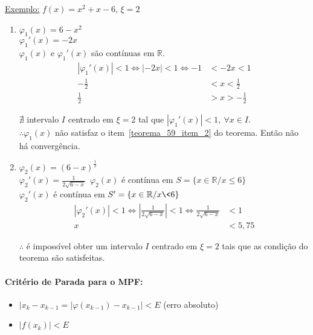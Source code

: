 \documentclass{article}
\begin{document}
        \underline{Exemplo:} $f(x) = x^2 + x - 6$, $\xi = 2$
        \begin{enumerate}
            \item $\varphi_1(x) = 6 - x^2$\\
                    $\varphi_1'(x) = -2x$\\
                    $\varphi_1(x)$ e $\varphi_1'(x)$ são contínuas em $\mathbb{R}$.
                    \begin{align*}
                        |\varphi_1'(x)| < 1 \iff |-2x| < 1 \iff -1 &< -2x < 1\\
                        - \frac{1}{2} &< x < \frac{1}{2}\\
                        \frac{1}{2} &> x > - \frac{1}{2}
                    \end{align*}

                    $\nexists$ intervalo $I$ centrado em $\xi = 2$ tal que $|\varphi_1'(x)| < 1,~\forall x \in I$.\\
                    $\therefore \varphi_1(x)$ não satisfaz o item~\ref{teorema_59_item_2} do teorema. Então não há convergência.
            \item $\varphi_2(x) = {(6-x)}^{\frac{1}{2}}$\\
                    $\varphi_2'(x) = \frac{1}{2\sqrt{6 - x}}$\
                    $\varphi_2(x)$ é contínua em $S = \{x \in \mathbb{R} / x \leq 6\}$\\
                    $\varphi_2'(x)$ é contínua em $S' = \{x \in \mathbb{R} / x \< 6\}$\\
                    \begin{align*}
                        |\varphi_2'(x)| < 1 \iff |\frac{1}{2\sqrt{6-x}}| < 1 \iff \frac{1}{2\sqrt{6-x}} &< 1\\
                        x &< 5,75
                    \end{align*}

                    $\therefore$ é impossível obter um intervalo $I$ centrado em $\xi = 2$ tais que as condição do teorema são satisfeitas.
        \end{enumerate}

        \paragraph{Critério de Parada para o MPF:}
        \begin{itemize}
            \item $|x_k - x_{k-1} = |\varphi(x_{k-1}) - x_{k-1}| < E$ (erro absoluto)
            \item $|f(x_k)| < E$
        \end{itemize}
\end{document}
